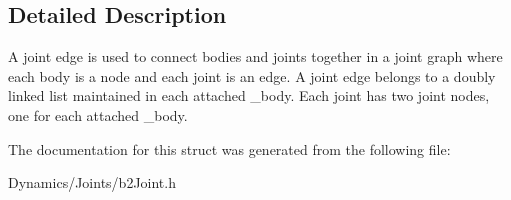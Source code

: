 \subsection{Detailed Description}
A joint edge is used to connect bodies and joints together in a joint graph where each body is a node and each joint is an edge. A joint edge belongs to a doubly linked list maintained in each attached _body. Each joint has two joint nodes, one for each attached _body.

The documentation for this struct was generated from the following file\+:\begin{DoxyCompactItemize}
\item 
Dynamics/\+Joints/b2\+Joint.\+h\end{DoxyCompactItemize}
